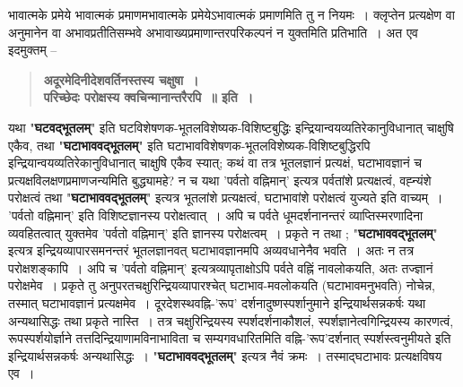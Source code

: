 {भावात्मके प्रमेये भावात्मकं प्रमाणमभावात्मके प्रमेयेऽभावात्मकं प्रमाणमिति तु न नियमः~। क्लृप्तेन प्रत्यक्षेण वा अनुमानेन वा अभावप्रतीतिसम्भवे अभावाख्यप्रमाणान्तरपरिकल्पनं न युक्तमिति प्रतिभाति~। अत एव इदमुक्तम् –
\begin{verse}
\textbf{अदूरमेदिनीदेशवर्तिनस्तस्य चक्षुषा~। \\
परिच्छेदः परोक्षस्य क्वचिन्मानान्तरैरपि~॥ इति~। }
\end{verse}
यथा "\textbf{घटवद्भूतलम्}" इति घटविशेषणक-भूतलविशेष्यक-विशिष्टबुद्धिः इन्द्रियान्वयव्यतिरेकानुविधानात् चाक्षुषि एकैव, तथा "\textbf{घटाभाववद्भूतलम्}" इति घटाभावविशेषणक-भूतल\-विशेष्यक-विशिष्टबुद्धिरपि इन्द्रियान्वयव्यतिरेकानुविधानात् चाक्षुषि एकैव स्यात्; कथं वा तत्र भूतलज्ञानं प्रत्यक्षं, घटाभावज्ञानं च प्रत्यक्षविलक्षणप्रमाणजन्यमिति बुद्ध्यामहे? न च यथा 'पर्वतो वह्निमान्' इत्यत्र पर्वतांशे प्रत्यक्षत्वं, वह्न्यंशे परोक्षत्वं तथा "\textbf{घटाभाववद्भू\-तलम्}" इत्यत्र भूतलांशे प्रत्यक्षत्वं, घटाभावांशे परोक्षत्वं युज्यते इति वाच्यम्~। 'पर्वतो वह्निमान्' इति विशिष्टज्ञानस्य परोक्षत्वात्~। अपि च पर्वते धूमदर्शनानन्तरं व्याप्तिस्मरणादिना व्यवहितत्वात् युक्तमेव 'पर्वतो वह्निमान्' इति ज्ञानस्य परोक्षत्वम्~। प्रकृते न तथा ; "\textbf{घटाभाववद्भू\-तलम्}" इत्यत्र इन्द्रियव्यापारसमनन्तरं भूतलज्ञानवत् घटाभावज्ञानमपि \-अव्यवधानेनैव भवति~। अतः न तत्र परोक्षशङ्कापि~। अपि च 'पर्वतो वह्निमान्' इत्यत्र\break व्यापृताक्षोऽपि पर्वते वह्निं नावलोकयति, अतः तज्ज्ञानं परोक्षमेव~। प्रकृते तु अनुपरत\-चक्षुरिन्द्रियव्यापारश्चेत् घटाभाव-मवलोकयति (घटाभावमनुभवति) नोचेन्न, तस्मात् घटाभावज्ञानं प्रत्यक्षमेव~। दूरदेशस्थवह्नि-'रूप' दर्शनादुष्णस्पर्शानुमाने इन्द्रियार्थसन्नकर्षः यथा अन्यथासिद्धः तथा प्रकृते नास्ति~। तत्र चक्षुरिन्द्रियस्य स्पर्शदर्शनाकौशलं, स्पर्शज्ञाने\break त्वगिन्द्रियस्य कारणत्वं, रूपस्पर्शयोर्ज्ञाने तत्तदिन्द्रियाणामविनाभाविता च सम्यगवधारितमिति वह्नि-'रूप'दर्शनात् स्पर्शस्त्वनुमीयते इति इन्द्रियार्थसन्नकर्षः अन्यथासिद्धः~। "\textbf{घटा\-भाववद्भूतलम्}" इत्यत्र नैवं क्रमः~। तस्माद्घटाभावः प्रत्यक्षविषय एव~। 

}
